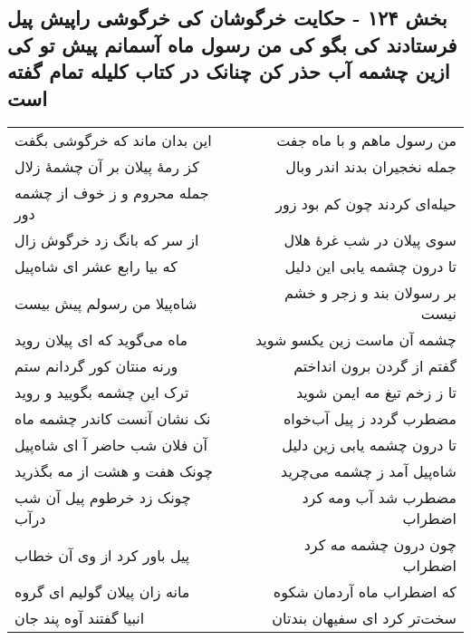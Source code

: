 \begin{center}
\section*{بخش ۱۲۴ - حکایت خرگوشان کی خرگوشی راپیش پیل  فرستادند کی بگو کی من رسول ماه آسمانم پیش تو کی ازین چشمه آب حذر کن چنانک در کتاب کلیله تمام گفته است}
\label{sec:sh124}
\begin{longtable}{l p{0.5cm} r}
این بدان ماند که خرگوشی بگفت
&&
من رسول ماهم و با ماه جفت
\\
کز رمهٔ پیلان بر آن چشمهٔ زلال
&&
جمله نخجیران بدند اندر وبال
\\
جمله محروم و ز خوف از چشمه دور
&&
حیله‌ای کردند چون کم بود زور
\\
از سر که بانگ زد خرگوش زال
&&
سوی پیلان در شب غرهٔ هلال
\\
که بیا رابع عشر ای شاه‌پیل
&&
تا درون چشمه یابی این دلیل
\\
شاه‌پیلا من رسولم پیش بیست
&&
بر رسولان بند و زجر و خشم نیست
\\
ماه می‌گوید که ای پیلان روید
&&
چشمه آن ماست زین یکسو شوید
\\
ورنه منتان کور گردانم ستم
&&
گفتم از گردن برون انداختم
\\
ترک این چشمه بگویید و روید
&&
تا ز زخم تیغ مه ایمن شوید
\\
نک نشان آنست کاندر چشمه ماه
&&
مضطرب گردد ز پیل آب‌خواه
\\
آن فلان شب حاضر آ ای شاه‌پیل
&&
تا درون چشمه یابی زین دلیل
\\
چونک هفت و هشت از مه بگذرید
&&
شاه‌پیل آمد ز چشمه می‌چرید
\\
چونک زد خرطوم پیل آن شب درآب
&&
مضطرب شد آب ومه کرد اضطراب
\\
پیل باور کرد از وی آن خطاب
&&
چون درون چشمه مه کرد اضطراب
\\
مانه زان پیلان گولیم ای گروه
&&
که اضطراب ماه آردمان شکوه
\\
انبیا گفتند آوه پند جان
&&
سخت‌تر کرد ای سفیهان بندتان
\\
\end{longtable}
\end{center}
